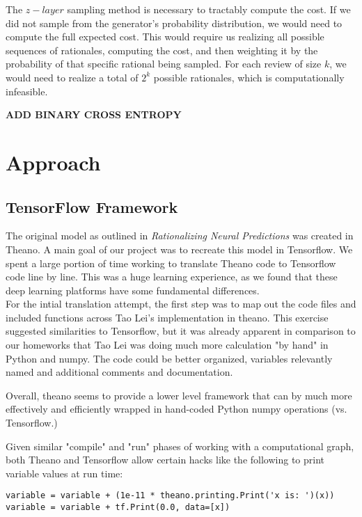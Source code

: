 \documentclass{article} %
\begin{document}
The $z-layer$ sampling method is necessary to tractably compute the cost. If we
did not sample from the generator's probability distribution, we would need to
compute the full expected cost. This would require us realizing all possible
sequences of rationales, computing the cost, and then weighting it by the
probability of that specific rational being sampled. For each review of size
$k$, we would need to realize a total of $2^{k}$ possible rationales, which is
computationally infeasible.

\textbf{ADD BINARY CROSS ENTROPY}

\section{Approach}

\subsection{TensorFlow Framework}

The original model as outlined in \textit{Rationalizing Neural Predictions} was
created in Theano. A main goal of our project was to recreate this model in
Tensorflow. We spent a large portion of time working to translate Theano code to
Tensorflow code line by line. This was a huge learning experience, as we found
that these deep learning platforms have some fundamental differences. \\

For the intial translation attempt, the first step was to map out the code files and included functions across Tao Lei's implementation in theano.  This exercise suggested similarities to Tensorflow, but it was already apparent in comparison to our homeworks that Tao Lei was doing much more calculation "by hand" in Python and numpy.  The code could be better organized, variables relevantly named and additional comments and documentation.

Overall, theano seems to provide a lower level framework that can by much more effectively and efficiently wrapped in hand-coded Python numpy operations (vs. Tensorflow.)

Given similar "compile" and "run" phases of working with a computational graph, both Theano and Tensorflow allow certain hacks like the following to print variable values at run time:
\begin{verbatim}
variable = variable + (1e-11 * theano.printing.Print('x is: ')(x))
variable = variable + tf.Print(0.0, data=[x])
\end{verbatim}
\end{document}
